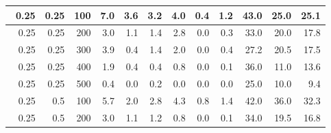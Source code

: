 \begin{longtable}{|r|r|r|r|r|r|r|r|r|r|r|r|}
    \hline \
    0.25                           & 0.25                    & 100                       & 7.0                       & 3.6                       & 3.2                       & 4.0                       & 0.4                       & 1.2                       & 43.0                      & 25.0                      & 25.1                      \\
    \hline \
    0.25                           & 0.25                    & 200                       & 3.0                       & 1.1                       & 1.4                       & 2.8                       & 0.0                       & 0.3                       & 33.0                      & 20.0                      & 17.8                      \\
    \hline \
    0.25                           & 0.25                    & 300                       & 3.9                       & 0.4                       & 1.4                       & 2.0                       & 0.0                       & 0.4                       & 27.2                      & 20.5                      & 17.5                       \\
    \hline \
    0.25                           & 0.25                     & 400                       & 1.9                       & 0.4                       & 0.4                       & 0.8                       & 0.0                       & 0.1                       & 36.0                      & 11.0                      & 13.6                      \\
    \hline \
    0.25                           & 0.25                     & 500                       & 0.4                       & 0.0                       & 0.2                       & 0.0                       & 0.0                       & 0.0                       & 25.0                      & 10.0                      & 9.4                      \\
    \hline \
    0.25                           & 0.5                     & 100                       & 5.7                       & 2.0                       & 2.8                       & 4.3                       & 0.8                       & 1.4                       & 42.0                      & 36.0                      & 32.3                      \\
    \hline \
    0.25                           & 0.5                     & 200                       & 3.0                       & 1.1                       & 1.2                       & 0.8                       & 0.0                       & 0.1                       & 34.0                      & 19.5                      & 16.8                      \\

\end{longtable}
